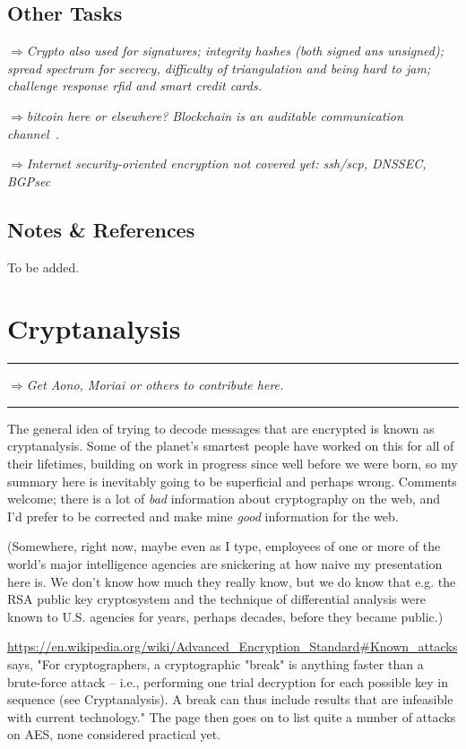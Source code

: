 \documentclass[%
 aip,
 jmp,%
 amsmath,amssymb,
 reprint,%
]{revtex4-1}
\def\outlinecomment#1{\hrule{\color{Blue}$\Rightarrow${\small\em #1}}\hrule}
\def\comment#1{{\color{ForestGreen}$\Rightarrow${\small\em #1}}}
\begin{document}
\subsection{Other Tasks}

\comment{Crypto also used for signatures; integrity hashes (both
  signed ans unsigned); spread spectrum for secrecy, difficulty of
  triangulation and being hard to jam; challenge response rfid and
  smart credit cards.}

\comment{bitcoin here or elsewhere?  Blockchain is an \emph{auditable
    communication channel}~\cite{suzuki2017blockchain}.}

\comment{Internet security-oriented encryption not covered yet: ssh/scp, DNSSEC, BGPsec}

\subsection{Notes \& References}

To be added.

\section{Cryptanalysis}

\outlinecomment{Get Aono, Moriai or others to contribute here.}

The general idea of trying to decode messages that are encrypted is
known as cryptanalysis.  Some of the planet's smartest people have
worked on this for all of their lifetimes, building on work in
progress since well before we were born, so my summary here is
inevitably going to be superficial and perhaps wrong.  Comments
welcome; there is a lot of \emph{bad} information about cryptography on the
web, and I'd prefer to be corrected and make mine \emph{good} information
for the web.

(Somewhere, right now, maybe even as I type, employees of one or more
of the world's major intelligence agencies are snickering at how naive
my presentation here is.  We don't know how much they really know, but
we do know that e.g. the RSA public key cryptosystem and the technique
of differential analysis were known to U.S. agencies for years,
perhaps decades, before they became public.)

\url{https://en.wikipedia.org/wiki/Advanced_Encryption_Standard#Known_attacks}
says, "For cryptographers, a cryptographic "break" is anything faster
than a brute-force attack – i.e., performing one trial decryption for
each possible key in sequence (see Cryptanalysis). A break can thus
include results that are infeasible with current technology."
The page then goes on to list quite a number of attacks on AES, none
considered practical yet.
\end{document}
